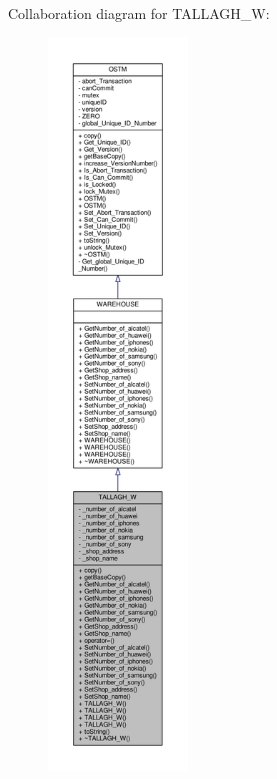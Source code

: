 Collaboration diagram for T\+A\+L\+L\+A\+G\+H\+\_\+W\+:\nopagebreak
\begin{figure}[H]
\begin{center}
\leavevmode
\includegraphics[height=550pt]{class_t_a_l_l_a_g_h___w__coll__graph}
\end{center}
\end{figure}
